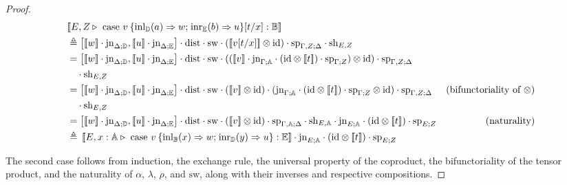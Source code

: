 \documentclass[10pt,a4paper]{amsart}
\theoremstyle{definition}
\theoremstyle{definition}
\theoremstyle{definition}
\theoremstyle{definition}
\theoremstyle{definition}
\theoremstyle{definition}
\begin{document}
\begin{proof}
\begin{align*}
  &[\![E, Z \vljud \text{ case } v  \hspace{2pt}  \{\text{inl}_{\typeD} (a) \Rightarrow w ; \hspace{1pt} \text{inr}_{\typeE} (b) \Rightarrow u\} [t/x]: \typeB]\!] \\
  & \triangleq  \left[[\![ w]\!] \cdot \text{jn}_{ \Delta;\typeD},[\![ u ]\!] \cdot \text{jn}_{ \Delta;\typeE}\right] \cdot \text{dist} \cdot \text{sw} \cdot ([\![ v [t/x] ]\!]   \otimes \text{id})  \cdot \text{sp}_{\Gamma, Z;\Delta} \cdot \text{sh}_{E,Z} \\
  & = \left[[\![w]\!] \cdot \text{jn}_{ \Delta;\typeD},[\![u ]\!] \cdot \text{jn}_{ \Delta;\typeE}\right] \cdot \text{dist} \cdot \text{sw} \cdot (([\![ v]\!]  \cdot \text{jn}_{\Gamma; \typeA} \cdot (\text{id} \otimes [\![  t ]\!] ) \cdot \text{sp}_{\Gamma;Z} )\otimes \text{id}) \cdot \text{sp}_{\Gamma, Z;\Delta} \\
  & \hspace{10pt} \cdot \text{sh}_{E,Z} \\
  & =  \left[[\![w]\!] \cdot \text{jn}_{ \Delta;\typeD},[\![u ]\!] \cdot \text{jn}_{ \Delta;\typeE}\right] \cdot \text{dist} \cdot \text{sw} \cdot ([\![ v]\!] \otimes \text{id}) \cdot (\text{jn}_{\Gamma; \typeA} \cdot (\text{id} \otimes [\![  t ]\!] ) \cdot \text{sp}_{\Gamma;Z} \otimes \text{id}) \cdot \text{sp}_{\Gamma, Z;\Delta}  & {\text{(bifunctoriality of $\otimes$)}} \\
  & \hspace{10pt} \cdot \text{sh}_{E,Z}\\
  & = \left[[\![w]\!] \cdot \text{jn}_{ \Delta;\typeD},[\![u ]\!] \cdot \text{jn}_{ \Delta;\typeE}\right] \cdot \text{dist} \cdot \text{sw} \cdot ([\![ v]\!] \otimes \text{id}) \cdot \text{sp}_{\Gamma, \typeA;\Delta}  \cdot \text{sh}_{E,\typeA}  \cdot  \text{jn}_{E; \typeA} \cdot (\text{id} \otimes [\![ t ]\!] ) \cdot \text{sp}_{E;Z}  & {(\text{naturality})}   \\
  & \triangleq  \hspace{2pt} [\![E,  x:\typeA \vljud \text{ case } v \hspace{2pt}  \{\text{inl}_{\typeB} (x) \Rightarrow w ; \hspace{1pt} \text{inr}_{\typeD} (y) \Rightarrow u\}: \typeE]\!]  \cdot  \text{jn}_{E; \typeA} \cdot (\text{id} \otimes [\![ t ]\!] ) \cdot \text{sp}_{E;Z}
\end{align*}


The second case follows from induction, the exchange rule, the universal property of the coproduct,  the bifunctoriality of the tensor product, and the naturality of $\alpha$, $\lambda$, $\rho$, and $\text{sw}$, along with their inverses and respective compositions.


\end{proof}
\end{document}
